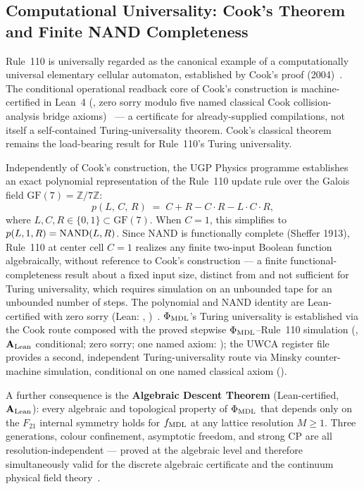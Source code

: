 \subsection{Computational Universality: Cook's Theorem and Finite NAND Completeness}
\label{subsec:overview-cup}

Rule~110 is universally regarded as the canonical example of a computationally
universal elementary cellular automaton, established by Cook's proof
(2004)~\cite{Cook2004}.  The conditional operational readback core of Cook's
construction is machine-certified in Lean~4
(, zero sorry modulo five named
classical Cook collision-analysis bridge axioms)~\cite{SpivackCookTheorem} --- a
certificate for already-supplied compilations, not itself a self-contained
Turing-universality theorem.  Cook's classical theorem remains the load-bearing
result for Rule~110's Turing universality.

Independently of Cook's construction, the UGP Physics programme establishes an exact
polynomial representation of the Rule~110 update rule over the Galois field
$\mathrm{GF}(7) = \mathbb{Z}/7\mathbb{Z}$:
\[
  p(L,\,C,\,R) \;=\; C + R - C{\cdot}R - L{\cdot}C{\cdot}R,
\]
where $L, C, R \in \{0,1\} \subset \mathrm{GF}(7)$.  When $C = 1$, this simplifies
to $p(L,1,R) = {\rm NAND}(L,R)$.  Since NAND is functionally complete (Sheffer
1913), Rule~110 at center cell $C=1$ realizes any finite two-input Boolean function
algebraically, without reference to Cook's construction --- a finite functional-
completeness result about a fixed input size, distinct from and not sufficient for
Turing universality, which requires simulation on an unbounded tape for an unbounded
number of steps.  The polynomial and NAND identity are Lean-certified with zero sorry
(Lean: , )~\cite{SpivackGF7Universality}.
$\Phi_{\rm MDL}$'s Turing universality is established via the Cook route composed with
the proved stepwise $\Phi_{\rm MDL}$--Rule~110 simulation
(, $\mathbf{A}_{\rm Lean}$ conditional; zero sorry;
one named axiom: ); the UWCA register file
provides a second, independent Turing-universality route via Minsky counter-machine
simulation, conditional on one named classical axiom
().

A further consequence is the \textbf{Algebraic Descent Theorem} (Lean-certified,
$\mathbf{A}_{\rm Lean}$): every algebraic and topological property of $\Phi_{\rm MDL}$
that depends only on the $F_{21}$ internal symmetry holds for $f_{\rm MDL}$ at any
lattice resolution $M \geq 1$.  Three generations, colour confinement, asymptotic
freedom, and strong CP are all resolution-independent --- proved at the algebraic level
and therefore simultaneously valid for the discrete algebraic certificate and the
continuum physical field theory~\cite{SpivackGTEUnification}.

